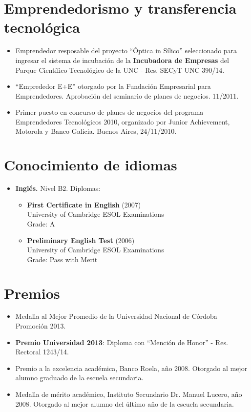 \documentclass[10pt]{article}
\begin{document}
 \section{Emprendedorismo y transferencia tecnológica}
 \begin{itemize}
  \item Emprendedor resposable del proyecto ``Óptica in Sílico'' seleccionado para ingresar el sistema de incubación de la {\bf Incubadora de Empresas} del Parque Científico Tecnológico de la UNC - Res. SECyT UNC 390/14.
  \item ``Emprededor E+E'' otorgado por la Fundación Empresarial para Emprendedores. Aprobación del seminario de planes de negocios. 11/2011.
  \item Primer puesto en concurso de planes de negocios del programa Emprendedores Tecnológicos 2010, organizado por Junior Achievement, Motorola y Banco Galicia. Buenos Aires, 24/11/2010.
 \end{itemize}

 \section{Conocimiento de idiomas}
\begin{itemize}
\item{\bf Inglés.} Nivel B2. Diplomas:
\begin{itemize}
\item {\bf First Certificate in English} (2007) \\
University of Cambridge ESOL Examinations\\
Grade: A
\item {\bf Preliminary English Test} (2006) \\
University of Cambridge ESOL Examinations \\
Grade: Pass with Merit
\end{itemize}
\end{itemize}
 
\section{Premios}
\begin{itemize}
\item Medalla al Mejor Promedio de la Universidad Nacional de Córdoba Promoción 2013.
\item {\bf Premio Universidad 2013}: Diploma con ``Mención de Honor'' - Res. Rectoral 1243/14.
\item {Premio a la excelencia académica}, Banco Roela, año 2008. Otorgado al mejor alumno graduado de la escuela secundaria.
\item {Medalla de mérito académico}, Instituto Secundario Dr. Manuel Lucero, año 2008. Otorgado al mejor alumno del último año de la escuela secundaria.
\end{itemize}
\end{document}
